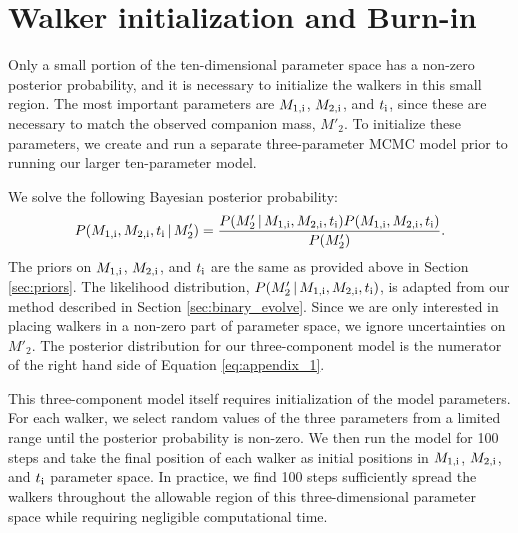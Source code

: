 \documentclass[usenatbib]{mnras}
\newcommand{\given}{\,|\,}
\begin{document}




\appendix

\section{Walker initialization and Burn-in} \label{sec:initialize}

Only a small portion of the ten-dimensional parameter space has a non-zero posterior probability, and it is necessary to initialize the walkers in this small region. The most important parameters are $M_{\rm 1,i}$, $M_{\rm 2,i}$, and $t_{\rm i}$, since these are necessary to match the observed companion mass, $M'_2$. To initialize these parameters, we create and run a separate three-parameter MCMC model prior to running our larger ten-parameter model. 




We solve the following Bayesian posterior probability:
\begin{equation}
P(M_{\rm 1,i}, M_{\rm 2,i}, t_{\rm i} \given M'_2) = \frac{ P(M'_2 \given M_{\rm 1,i}, M_{\rm 2,i}, t_{\rm i} ) P( M_{\rm 1,i}, M_{\rm 2,i}, t_{\rm i} )}{P(M'_2)}. \label{eq:appendix_1}
\end{equation}
The priors on $M_{\rm 1,i}$, $M_{\rm 2,i}$, and $t_{\rm i}$ are the same as provided above in Section \ref{sec:priors}. The likelihood distribution, $P(M'_2 \given M_{\rm 1,i}, M_{\rm 2,i}, t_{\rm i} )$, is adapted from our method described in Section \ref{sec:binary_evolve}. Since we are only interested in placing walkers in a non-zero part of parameter space, we ignore uncertainties on $M'_2$. The posterior distribution for our three-component model is the numerator of the right hand side of Equation \ref{eq:appendix_1}. 


This three-component model itself requires initialization of the model parameters. For each walker, we select random values of the three parameters from a limited range until the posterior probability is non-zero. We then run the model for 100 steps and take the final position of each walker as initial positions in $M_{\rm 1,i}$, $M_{\rm 2,i}$, and $t_{\rm i}$ parameter space. In practice, we find 100 steps sufficiently spread the walkers throughout the allowable region of this three-dimensional parameter space while requiring negligible computational time.
\end{document}
